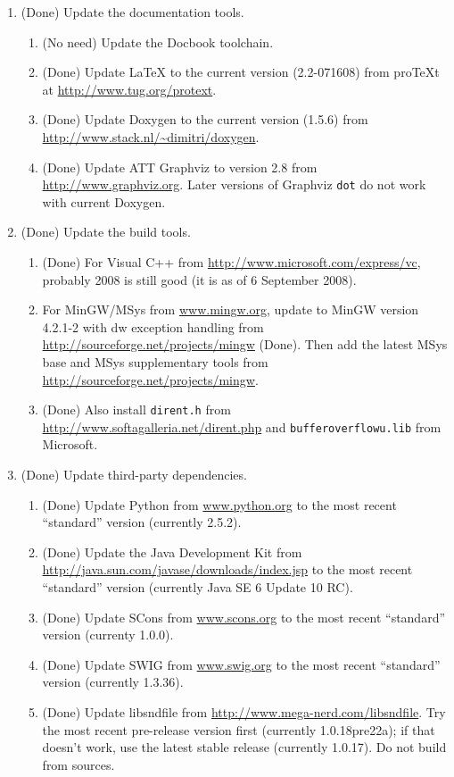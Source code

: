 \documentclass[11pt,letterpaper,onecolumn]{scrartcl}
\begin{document}
\begin{sloppypar}
\begin{enumerate}
	\item (Done) Update the documentation tools.
		\begin{enumerate}
	    \item (No need) Update the Docbook toolchain.
	    \item (Done) Update LaTeX to the current version (2.2-071608) from proTeXt at \url{http://www.tug.org/protext}.
	    \item (Done) Update Doxygen to the current version (1.5.6) from \url{http://www.stack.nl/~dimitri/doxygen}.
	    \item (Done) Update ATT Graphviz to version 2.8 from \url{http://www.graphviz.org}. Later versions of Graphviz \texttt{dot} do not work with current Doxygen.
		\end{enumerate}
	\item (Done) Update the build tools.   
		\begin{enumerate}
			\item (Done) For Visual C++ from \url{http://www.microsoft.com/express/vc}, probably 2008 is still good (it is as of 6 September 2008). 
			\item For MinGW/MSys from \url{www.mingw.org}, update to MinGW version 4.2.1-2 with dw exception handling from \url{http://sourceforge.net/projects/mingw} (Done). Then add the latest MSys base and MSys supplementary tools from \url{http://sourceforge.net/projects/mingw}.
			\item (Done) Also install \texttt{dirent.h} from \url{http://www.softagalleria.net/dirent.php} and \texttt{bufferoverflowu.lib}  from Microsoft.
		\end{enumerate}    
	\item (Done) Update third-party dependencies.   
		\begin{enumerate}
  		\item (Done) Update Python from \url{www.python.org} to the most recent ``standard'' version (currently 2.5.2).
	    \item (Done) Update the Java Development Kit from \url{http://java.sun.com/javase/downloads/index.jsp} to the most recent ``standard'' version (currently Java SE 6 Update 10 RC).
	    \item (Done) Update SCons from \url{www.scons.org} to the most recent ``standard'' version (currenty 1.0.0).
	    \item (Done) Update SWIG from \url{www.swig.org} to the most recent ``standard'' version (currently 1.3.36).
			\item (Done) Update libsndfile from \url{http://www.mega-nerd.com/libsndfile}. Try the most recent pre-release version first (currently 1.0.18pre22a); if that doesn't work, use the latest stable release (currently 1.0.17). Do not build from sources. 

\end{enumerate}
\end{enumerate}
\end{sloppypar}
\end{document}
